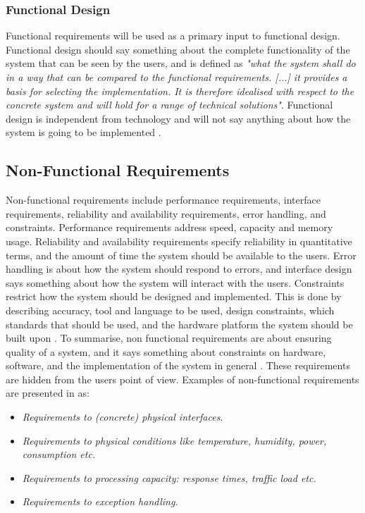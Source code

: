 \subsubsection{Functional Design}
Functional requirements will be used as a primary input to functional design. Functional design should say something about the complete functionality of the system that can be seen by the users, and is defined as \emph{"what the system shall do in a way that can be compared to the functional requirements. [...] it provides a basis for selecting the implementation. It is therefore idealised with respect to the concrete system and will hold for a range of technical solutions"}. Functional design is independent from technology and will not say anything about how the system is going to be implemented \cite{systemutviklingDel1}. 

\subsection{Non-Functional Requirements}
Non-functional requirements include performance requirements, interface requirements, reliability and availability requirements, error handling, and constraints. Performance requirements address speed, capacity and memory usage. Reliability and availability requirements specify reliability in quantitative terms, and the amount of time the system should be available to the users. Error handling is about how the system should respond to errors, and interface design says something about how the system will interact with the users. Constraints restrict how the system should be designed and implemented. This is done by describing accuracy, tool and language to be used, design constraints, which standards that should be used, and the hardware platform the system should be built upon \cite{braude2000software}. To summarise, non functional requirements are about ensuring quality of a system, and it says something about constraints on hardware, software, and the implementation of the system in general \cite{mmi}. These requirements are hidden from the users point of view. Examples of non-functional requirements are presented in \cite{systemutviklingDel1} as:
\begin{itemize}
\item \emph{Requirements to (concrete) physical interfaces.}
\item \emph{Requirements to physical conditions like temperature, humidity, power, consumption etc.}
\item \emph{Requirements to processing capacity: response times, traffic load etc.}
\item \emph{Requirements to exception handling.} \\ \\ 
\end{itemize}   

